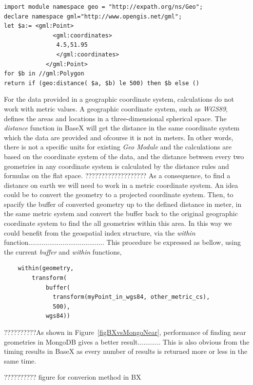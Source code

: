 \documentclass[a4paper,12pt]{article}
\begin{document}
\begin{verbatim}
import module namespace geo = "http://expath.org/ns/Geo";
declare namespace gml="http://www.opengis.net/gml";
let $a:= <gml:Point>
              <gml:coordinates>
               4.5,51.95 
               </gml:coordinates>
            </gml:Point>
for $b in //gml:Polygon 
return if (geo:distance( $a, $b) le 500) then $b else ()
\end{verbatim}


For the data provided in a geographic coordinate system\cite{}, calculations do not work with metric values. A geographic coordinate system, such as \textit{WGS89}, defines the areas and locations in a three-dimensional spherical space. The \textit{distance} function in BaseX will get the distance in the same coordinate system which the data are provided and ofcourse it is not in meters. In other words, there is not a specific units for existing \textit{Geo Module} and the calculations are based on the coordinate system of the data, and the distance between every two geometries in any coordinate system is calculated by the distance rules and formulas on the flat space. ???????????????????
As a consequence, to find a distance on earth we will need to work in a metric coordinate system. An idea could be to convert the geometry to a projected coordinate system. Then, to spacify the buffer of converted geometry up to the defined distance in meter, in the same metric system and convert the buffer back to the original geographic coordinate system to find the all geometries within this area. In this way we could benefit from the geospatial index structure, via the \textit{within} function........................................
This procedure be expressed as bellow, using the current \textit{buffer} and \textit{within} functions, 

\begin{verbatim} 
	within(geometry,
		transform(
			buffer(
			  transform(myPoint_in_wgs84, other_metric_cs),
			  500),
			wgs84))
\end{verbatim}


??????????As shown in Figure~\ref{figBXvsMongoNear}, performance of finding near geometries in MongoDB gives a better result............
This is also obvious from the timing results in BaseX as every number of results is returned more or less in the same time.

?????????? figure for converion method in BX


\end{document}
